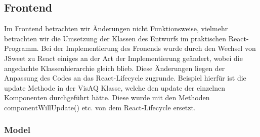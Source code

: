 \subsection{Frontend}
Im Frontend betrachten wir Änderungen nicht Funktionsweise, vielmehr betrachten wir die Umsetzung der Klassen des Entwurfs im praktischen React-Programm.
Bei der Implementierung des Fronends wurde durch den Wechsel von JSweet zu React einiges an der Art der Implementierung geändert, wobei die angedachte Klassenhierarchie gleich blieb.
Diese Änderungen liegen der Anpassung des Codes an das React-Lifecycle zugrunde. Beispiel hierfür ist die update Methode in der VisAQ Klasse, welche den update der einzelnen Komponenten
durchgeführt hätte. Diese wurde mit den Methoden componentWillUpdate() etc. von dem React-Lifecycle ersetzt. 

\subsubsection{Model}
\toJSON
{}
\toJSON
{}
\toJSON
{}
\toJSON
{}
\toJSON
{}
\toJSON
{}
\toJSON
{}
\toJSON
{}
\toJSON
{}
\toJSON
{}
\toJSON
{}
\toJSON

